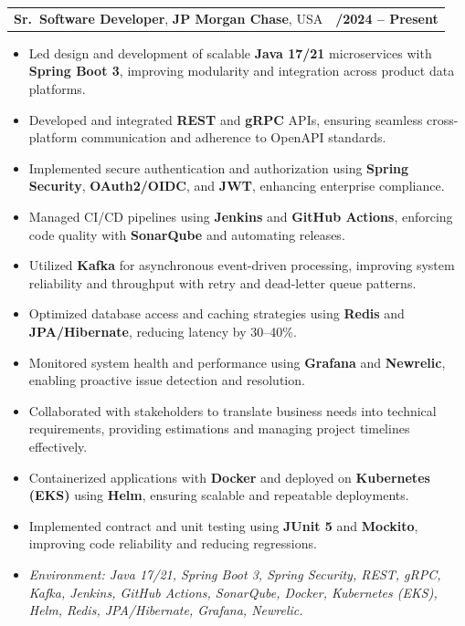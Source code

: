 \documentclass[letterpaper,11pt]{article}
\makeatletter
\newcommand{\resumeItem}[1]{
  \item\footnotesize{
    {#1 \vspace{-2pt}}
  }
}
\newcommand{\resumeSubheading}[4]{
  \vspace{-2pt}\item
    \begin{tabular*}{1.0\textwidth}[t]{l@{\extracolsep{\fill}}r}
      \textbf{\fontsize{10pt}{14pt}\selectfont #3}, \textbf{\fontsize{10pt}{14pt}\selectfont #1}, \fontsize{10pt}{14pt}\selectfont #4 & \textbf{\fontsize{10pt}{14pt}\selectfont #2} \\
    \end{tabular*}\vspace{-7pt}
}
\newcommand{\resumeItemListStart}{\begin{itemize}[leftmargin=*]}
\newcommand{\resumeItemListEnd}{\end{itemize}\vspace{-5pt}}
\makeatother
\begin{document}
\resumeSubheading
{JP Morgan Chase}{09/2024 -- Present}
{Sr.\ Software Developer}{USA}
\resumeItemListStart
  \resumeItem{Led design and development of scalable \textbf{Java 17/21} microservices with \textbf{Spring Boot 3}, improving modularity and integration across product data platforms.}
  \resumeItem{Developed and integrated \textbf{REST} and \textbf{gRPC} APIs, ensuring seamless cross-platform communication and adherence to OpenAPI standards.}
  \resumeItem{Implemented secure authentication and authorization using \textbf{Spring Security}, \textbf{OAuth2/OIDC}, and \textbf{JWT}, enhancing enterprise compliance.}
  \resumeItem{Managed CI/CD pipelines using \textbf{Jenkins} and \textbf{GitHub Actions}, enforcing code quality with \textbf{SonarQube} and automating releases.}
  \resumeItem{Utilized \textbf{Kafka} for asynchronous event-driven processing, improving system reliability and throughput with retry and dead-letter queue patterns.}
  \resumeItem{Optimized database access and caching strategies using \textbf{Redis} and \textbf{JPA/Hibernate}, reducing latency by 30--40\%.}
  \resumeItem{Monitored system health and performance using \textbf{Grafana} and \textbf{Newrelic}, enabling proactive issue detection and resolution.}
  \resumeItem{Collaborated with stakeholders to translate business needs into technical requirements, providing estimations and managing project timelines effectively.}
  \resumeItem{Containerized applications with \textbf{Docker} and deployed on \textbf{Kubernetes (EKS)} using \textbf{Helm}, ensuring scalable and repeatable deployments.}
  \resumeItem{Implemented contract and unit testing using \textbf{JUnit 5} and \textbf{Mockito}, improving code reliability and reducing regressions.}
  \resumeItem{\textit{Environment: Java 17/21, Spring Boot 3, Spring Security, REST, gRPC, Kafka, Jenkins, GitHub Actions, SonarQube, Docker, Kubernetes (EKS), Helm, Redis, JPA/Hibernate, Grafana, Newrelic.}}
\resumeItemListEnd
\end{document}
